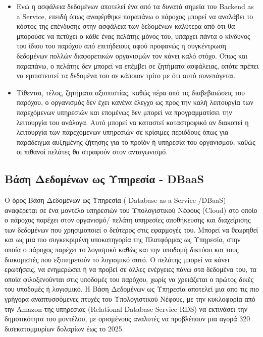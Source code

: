 \documentclass{article}
\begin{document}
\begin{itemize}
\item Ενώ η ασφάλεια δεδομένων αποτελεί ένα από τα δυνατά σημεία του Backend as a Service, επειδή όπως αναφέρθηκε παραπάνω ο πάροχος μπορεί να αναλάβει το κόστος της επένδυσης στην ασφάλεια των δεδομένων καλύτερα από ότι θα μπορούσε να πετύχει ο κάθε ένας πελάτης μόνος του, υπάρχει πάντα ο κίνδυνος του ίδιου του παρόχου από επιτήδειους αφού προφανώς η συγκέντρωση δεδομένων πολλών διαφορετικών οργανισμών τον κάνει καλό στόχο. Όπως και παραπάνω, ο πελάτης δεν μπορεί να επέμβει σε ζητήματα ασφάλειας, οπότε πρέπει να εμπιστευτεί τα δεδομένα του σε κάποιον τρίτο με ότι αυτό συνεπάγεται.
\item Τίθενται, τέλος, ζητήματα αξιοπιστίας, καθώς πέρα από τις διαβεβαιώσεις του παρόχου, ο οργανισμός δεν έχει κανένα έλεγχο ως προς την καλή λειτουργία των παρεχόμενων υπηρεσιών και επομένως δεν μπορεί να προγραμματίσει την λειτουργία του ανάλογα. Αυτό μπορεί να καταστεί καταστροφικό αν διακοπεί η λειτουργία των παρεχόμενων υπηρεσιών σε κρίσιμες περιόδους όπως για παράδειγμα αυξημένης ζήτησης για το προϊόν ή υπηρεσία του οργανισμού, καθώς οι πιθανοί πελάτες θα στραφούν στον ανταγωνισμό.
\end{itemize}



\subsection{Βάση Δεδομένων ως Υπηρεσία - DBaaS}
Ο όρος Βάση Δεδομένων ως Υπηρεσία ( Database as a Service /DBaaS) αναφέρεται σε ένα μοντέλο υπηρεσιών του Υπολογιστικού Νέφους (Cloud) στο οποίο ο πάροχος παρέχει στον οργανισμό/ πελάτη υπηρεσίες αποθήκευσης και διαχείρισης των δεδομένων που χρησιμοποιεί ο δεύτερος στις εφαρμογές του. Μπορεί να θεωρηθεί και ως μια πιο συγκεκριμένη υποκατηγορία της Πλατφόρμας ως Υπηρεσία, στην οποία ο πάροχος παρέχει το λογισμικό καθώς και την υποδομή δικτύου και τους διακομιστές που εξυπηρετούν το λογισμικό αυτό. Ο πελάτης μπορεί να κάνει ερωτήσεις, να ενημερώσει ή να προβεί σε άλλες ενέργειες πάνω στα δεδομένα του, τα οποία φιλοξενούνται στις υποδομές του παρόχου, χωρίς να χρειάζεται ο πρώτος δικές του υποδομές ή λογισμικό. Η Βάση Δεδομένων ως Υπηρεσία αποτελεί μια απο τις πιο γρήγορα αναπτυσσόμενες πτυχές του Υπολογιστικού Νέφους, με την κυκλοφορία από την Amazon της υπηρεσίας (Relational Database Service RDS) να εκτινάσει την δημοτικότητα του μοντέλου, με ορισμένους αναλυτές να προβλέπουν μια αγορά 320 δισεκατομμυρίων δολαρίων έως το 2025.
\end{document}
